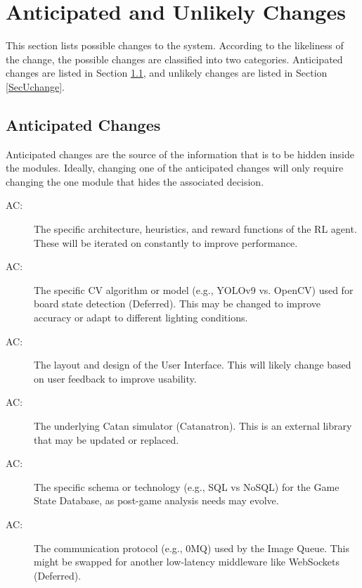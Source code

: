 \documentclass[12pt, titlepage]{article}
\newcounter{acnum}
\newcommand{\actheacnum}{AC\theacnum}
\begin{document}
\section{Anticipated and Unlikely Changes} \label{SecChange}

This section lists possible changes to the system.
According to the likeliness of the change, the possible changes are classified into two categories.
Anticipated changes are listed in Section \ref{SecAchange}, and unlikely changes are listed in Section \ref{SecUchange}.

\subsection{Anticipated Changes} \label{SecAchange}

Anticipated changes are the source of the information that is to be hidden inside the modules.
Ideally, changing one of the anticipated changes will only require changing the one module that hides the associated decision.

\begin{description}
\item[ \actheacnum \label{acAIModel}:] The specific architecture, heuristics, and reward functions of the RL agent.
These will be iterated on constantly to improve performance.
\item[ \actheacnum \label{acCVModel}:] The specific CV algorithm or model (e.g., YOLOv9 vs.
OpenCV) used for board state detection (Deferred).
This may be changed to improve accuracy or adapt to different lighting conditions.
\item[ \actheacnum \label{acUI}:] The layout and design of the User Interface.
This will likely change based on user feedback to improve usability.
\item[ \actheacnum \label{acSimulator}:] The underlying Catan simulator (Catanatron).
This is an external library that may be updated or replaced.
\item[ \actheacnum \label{acDatabase}:] The specific schema or technology (e.g., SQL vs NoSQL) for the Game State Database, as post-game analysis needs may evolve.
\item[ \actheacnum \label{acComm}:] The communication protocol (e.g., 0MQ) used by the Image Queue.
This might be swapped for another low-latency middleware like WebSockets (Deferred).
\end{description}
\end{document}
